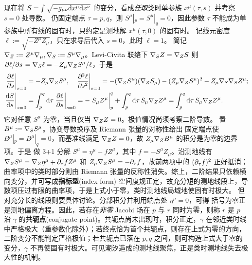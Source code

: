现在将 $S=\int\sqrt{-g_{\mu\nu}\dd x^\mu\dd x^\nu}$ 的变分，看成\emph{任取}类时单参族 $x^\mu(\tau,s)$ 并考察 $s=0$ 处导数。
仍固定端点 $\tau=p,q$，则 $S^\mu|_p=S^\mu|_q=0$，因此参数 $\tau$ 不能成为单参族中所有线的固有时，只约定是测地解 $x^\mu(\tau,0)$ 的固有时。
记线元密度 $\ell:=\sqrt{-Z^\mu Z_\mu}$，只在求导后代入 $s=0$，此时 $\ell=1$。
简记 $\nabla_Z:=Z^\mu\nabla_\mu,\nabla_S:=S^\mu\nabla_\mu$。Levi-Civita 联络下 $\nabla_SZ=\nabla_ZS$ 则 $\pdv*{\ell}{s}=\nabla_S\ell=-Z_\mu\nabla_ZS^\mu/\ell$，于是
\begin{align*}
    \eval{\pdv{\ell}{s}}_{s=0}&=-Z_\mu\cd_ZS^\mu,\quad
    \eval{\pdv[2]{\ell}{s}}_{s=0}
    =-(\cd_ZS^\mu)(\cd_ZS_\mu)-(Z_\mu\cd_ZS^\mu)^2-Z_\mu\cd_S\cd_SZ^\mu;\\
    \eval{\dv{S}{s}}_{s=0} &= \int_p^q\d{\tau}\eval{\pdv{\ell}{s}}_{s=0} = -\eval{S_\mu Z^\mu}_p^q+\int_p^q\d\tau\,S_\mu \cd_Z Z^\mu=\int_p^q\d\tau\,S_\mu \cd_Z Z^\mu.
\end{align*}
它对任意 $S^\mu$ 为零，当且仅当 $\nabla_Z Z=0$。极值情况尚须考察二阶导数。
置 $B^\mu:=\nabla_SS^\mu$。协变导数换序及 Riemann 张量的对称性给出
固定端点使 $B^\mu|_p=B^\mu|_q=0$，而基准线满足 $\nabla_ZZ=0$，故 $Z_\mu\nabla_ZB^\mu$ 的积分是为零的边界项。于是
做 3+1 分解 $S^\mu=\eta^\mu+fZ^\mu$，其中 $f=-S^\mu Z_\mu$。沿测地线有 $\nabla_ZS^\mu=\nabla_Z\eta^\mu+\partial_\tau f Z^\mu$ 和 $Z_\mu\nabla_ZS^\mu=-\partial_\tau f$，故前两项中的 $(\partial_\tau f)^2$ 正好抵消；曲率项中的类时部分则由 Riemann 张量的反称性消失。综上，二阶结果只依赖横向变分，并可写成\textbf{指标型}(index form)
空间度规正定，故充分短的测地线段上，导数项压过有限的曲率项，于是上式小于零，类时测地线局域地使固有时极大。
但对充分长的线段则要具体讨论。分部积分并利用端点处 $\eta^\mu=0$，可得
括号为零正是测地偏离方程。因此，若存在\emph{非零} Jacobi 场在 $p$ 与 $r$ 同时为零，则称 $r$ 是 $p$ 沿 $\gamma$ 的\textbf{共轭点}(conjugate point)。共轭点尚未出现时，积分正定，$\gamma$ 在邻近类时线中严格极大（重参数化除外）；若终点恰为首个共轭点，则存在上式为零的方向，二阶变分不能判定严格极值；若共轭点已落在 $p,q$ 之间，则可构造上式大于零的变分，$\gamma$ 不再使固有时极大。可见潮汐造成的测地线聚焦，正是类时测地线失去极大性的机制。


